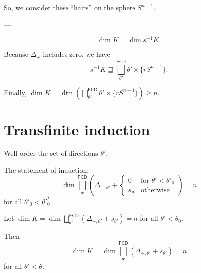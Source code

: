 \documentclass{amsart}
\newcommand{\funcoids}{\mathsf{FCD}}
\begin{document}
So, we consider these ``hairs'' on the sphere $S^{n-1}$.

---

\[ \dim K = \dim s^{-1}K. \]

Because $\Delta_{+}$ includes zero, we have \[ s^{-1}K \sqsupseteq \bigsqcup^{\funcoids}_{\theta'} \theta' \times\{rS^{n-1}\}. \]

Finally, $\dim K=\dim\left(\bigsqcup^{\funcoids}_{\theta'} \theta' \times\{rS^{n-1}\}\right)\geq n$.

\section{Transfinite induction}

Well-order the set of directions $\theta'$.

The statement of induction:
\[ \dim\bigsqcup^{\funcoids}_{\theta'} \left(\Delta_{+,\theta'}+\begin{cases}0&\text{for }\theta'<\theta'_0\\s_{\theta'}&\text{otherwise}\end{cases}\right) = n \]
for all $\theta'_0<\theta'^{\ast}_0$

Let $\dim K = \dim\bigsqcup^{\funcoids}_{\theta'} (\Delta_{+,\theta'}+s_{\theta'}) = n$ for all $\theta'<\theta_0$.

Then \[ \dim K = \dim\bigsqcup^{\funcoids}_{\theta'} (\Delta_{+,\theta'}+s_{\theta'}) = n \] for all $\theta'<\theta$.



\end{document}
